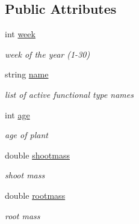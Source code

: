 \subsection*{Public Attributes}
\begin{DoxyCompactItemize}
\item 
\mbox{\label{struct_s_ind_out_a414e8afea8e150815bf557eb7e385333}} 
int \mbox{\hyperlink{struct_s_ind_out_a414e8afea8e150815bf557eb7e385333}{week}}
\begin{DoxyCompactList}\small\item\em week of the year (1-\/30) \end{DoxyCompactList}\item 
\mbox{\label{struct_s_ind_out_a08afee2407f7f1e35dd380cdb795fad4}} 
string \mbox{\hyperlink{struct_s_ind_out_a08afee2407f7f1e35dd380cdb795fad4}{name}}
\begin{DoxyCompactList}\small\item\em list of active functional type names \end{DoxyCompactList}\item 
\mbox{\label{struct_s_ind_out_a5fd635ac4512d4f1a33fda9428036841}} 
int \mbox{\hyperlink{struct_s_ind_out_a5fd635ac4512d4f1a33fda9428036841}{age}}
\begin{DoxyCompactList}\small\item\em age of plant \end{DoxyCompactList}\item 
\mbox{\label{struct_s_ind_out_ae911e4d68af7e9534a26f3b0b81ae009}} 
double \mbox{\hyperlink{struct_s_ind_out_ae911e4d68af7e9534a26f3b0b81ae009}{shootmass}}
\begin{DoxyCompactList}\small\item\em shoot mass \end{DoxyCompactList}\item 
\mbox{\label{struct_s_ind_out_ad81ab280d3787afa9e61168f3eb3aceb}} 
double \mbox{\hyperlink{struct_s_ind_out_ad81ab280d3787afa9e61168f3eb3aceb}{rootmass}}
\begin{DoxyCompactList}\small\item\em root mass \end{DoxyCompactList}\end{DoxyCompactItemize}


